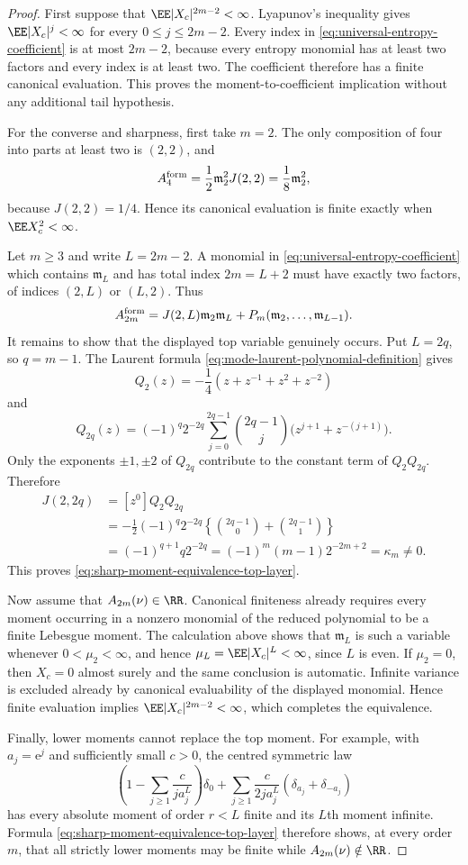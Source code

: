 \begin{proof}
First suppose that \(\EE|X_c|^{2m-2}<\infty\).  Lyapunov's inequality gives
\(\EE|X_c|^j<\infty\) for every \(0\le j\le2m-2\).  Every index in
\eqref{eq:universal-entropy-coefficient} is at most \(2m-2\), because every
entropy monomial has at least two factors and every index is at least two.
The coefficient therefore has a finite canonical evaluation.  This proves
the moment-to-coefficient implication without any additional tail
hypothesis.

For the converse and sharpness, first take \(m=2\).  The only composition
of four into parts at least two is \((2,2)\), and
\[
 A_4^{\rm form}=\frac12\mathfrak m_2^2J(2,2)
 =\frac18\mathfrak m_2^2,
\]
because \(J(2,2)=1/4\).  Hence its canonical evaluation is finite exactly
when \(\EE X_c^2<\infty\).

Let \(m\ge3\) and write \(L=2m-2\).  A monomial in
\eqref{eq:universal-entropy-coefficient} which contains
\(\mathfrak m_L\) and has total index \(2m=L+2\) must have exactly two
factors, of indices \((2,L)\) or \((L,2)\).  Thus
\[
 A_{2m}^{\rm form}
 =J(2,L)\mathfrak m_2\mathfrak m_L
  +P_m(\mathfrak m_2,\ldots,\mathfrak m_{L-1}).
\]
It remains to show that the displayed top variable genuinely occurs.  Put
\(L=2q\), so \(q=m-1\).  The Laurent formula
\eqref{eq:mode-laurent-polynomial-definition} gives
\[
Q_2(z)=-\frac14(z+z^{-1}+z^2+z^{-2})
\]
and
\[
Q_{2q}(z)=(-1)^q2^{-2q}
\sum_{j=0}^{2q-1}\binom{2q-1}{j}
\bigl(z^{j+1}+z^{-(j+1)}\bigr).
\]
Only the exponents \(\pm1,\pm2\) of \(Q_{2q}\) contribute to the constant
term of \(Q_2Q_{2q}\).  Therefore
\begin{align*}
J(2,2q)
&=[z^0]Q_2Q_{2q}\\
&=-\frac12(-1)^q2^{-2q}
  \left\{\binom{2q-1}{0}+\binom{2q-1}{1}\right\}\\
&=(-1)^{q+1}q2^{-2q}
 =(-1)^m(m-1)2^{-2m+2}=\kappa_m\ne0.
\end{align*}
This proves \eqref{eq:sharp-moment-equivalence-top-layer}.

Now assume that \(A_{2m}(\nu)\in\RR\).  Canonical finiteness already
requires every moment occurring in a nonzero monomial of the reduced
polynomial to be a finite Lebesgue moment.  The calculation above shows that
\(\mathfrak m_L\) is such a variable whenever \(0<\mu_2<\infty\), and hence
\(\mu_L=\EE|X_c|^L<\infty\), since \(L\) is even.  If \(\mu_2=0\), then
\(X_c=0\) almost surely and the same conclusion is automatic.  Infinite
variance is excluded already by canonical evaluability of the displayed
monomial.  Hence finite evaluation implies \(\EE|X_c|^{2m-2}<\infty\),
which completes the equivalence.

Finally, lower moments cannot replace the top moment.  For example, with
\(a_j=\mathrm e^j\) and sufficiently small \(c>0\), the centred symmetric
law
\[
\left(1-\sum_{j\ge1}\frac{c}{j a_j^L}\right)\delta_0
+\sum_{j\ge1}\frac{c}{2j a_j^L}
 (\delta_{a_j}+\delta_{-a_j})
\]
has every absolute moment of order \(r<L\) finite and its \(L\)th moment
infinite.  Formula \eqref{eq:sharp-moment-equivalence-top-layer} therefore
shows, at every order \(m\), that all strictly lower moments may be finite
while \(A_{2m}(\nu)\notin\RR\).
\end{proof}

